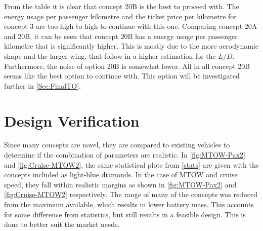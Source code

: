 From the table it is clear that concept 20B is the best to proceed with. The energy usage per passenger kilometre and the ticket price per kilometre for concept 3 are too high to high to continue with this one. Comparing concept 20A and 20B, it can be seen that concept 20B has a energy usage per passenger kilometre that is significantly higher. This is mostly due to the more aerodynamic shape and the larger wing, that follow in a higher estimation for the $L/D$. Furthermore, the noise of option 20B is somewhat lower. All in all concept 20B seems like the best option to continue with. This option will be investigated further in \autoref{Sec:FinalTO}.  


\section{Design Verification}
Since many concepts are novel, they are compared to existing vehicles to determine if the combination of parameters are realistic. In \autoref{fig:MTOW-Pax2} and \autoref{fig:Cruise-MTOW2}, the same statistical plots from \autoref{stats} are given with the concepts included as light-blue diamonds. In the case of MTOW and cruise speed, they fall within realistic margins as shown in \autoref{fig:MTOW-Pax2} and \autoref{fig:Cruise-MTOW2} respectively. The range of many of the concepts was reduced from the maximum available, which results in lower battery mass. This accounts for some difference from statistics, but still results in a feasible design. This is done to better suit the market needs.

